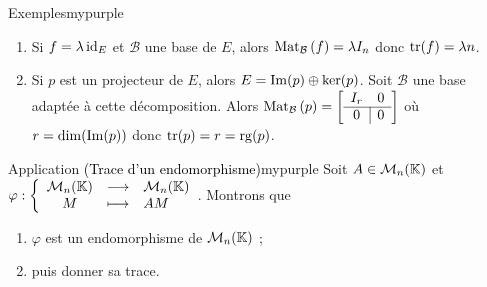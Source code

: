     \begin{omed}{Exemples}{mypurple}
        \begin{enumerate}[label=\textcolor{mypurple}{\arabic*.}]
            \item Si $f = \lambda \operatorname{id}_E$ et $\mathcal{B}$ une base de $E$, alors $\text{Mat}_{\mathcal{B}}\left(f\right) = \lambda I_n$ donc $\operatorname{tr}(f) = \lambda n$.
            \item Si $p$ est un projecteur de $E$, alors $E = \operatorname{Im}(p) \oplus \ker(p)$. Soit $\mathcal{B}$ une base adaptée à cette décomposition. Alors $\text{Mat}_{\mathcal{B}}\left(p\right) = \left[ \begin{array}{c | c}
                I_r & 0 \\
                \hline
                0 & 0
            \end{array} \right]$ où $r = \dim(\operatorname{Im}(p))$ donc $\operatorname{tr}(p) = r = \operatorname{rg}(p)$.
        \end{enumerate}
    \end{omed}

    \begin{omed}{Application \textcolor{black}{(Trace d’un endomorphisme)}}{mypurple}
        Soit $A \in \mathcal{M}_{n}(\mathbb{K})$ et $\fonction{\varphi}{\mk{n}}{\mk{n}}{M}{AM}$.
        Montrons que 
        \begin{enumerate}[label = \textcolor{mypurple}{\alph* |}]
            \item $\varphi$ est un endomorphisme de $\mathcal{M}_{n}(\mathbb{K})$ ;
            \item puis donner sa trace.
        \end{enumerate}
    \end{omed}

